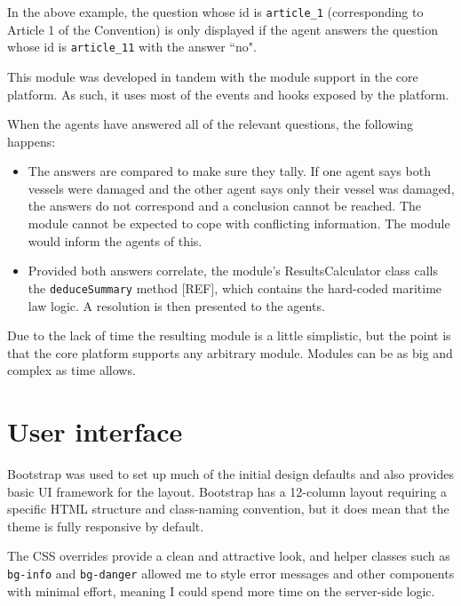 In the above example, the question whose id is \lstinline{article_1} (corresponding to Article 1 of the Convention) is only displayed if the agent answers the question whose id is \lstinline{article_11} with the answer ``no".

This module was developed in tandem with the module support in the core platform. As such, it uses most of the events and hooks exposed by the platform.

When the agents have answered all of the relevant questions, the following happens:

\begin{itemize}
    \item The answers are compared to make sure they tally. If one agent says both vessels were damaged and the other agent says only their vessel was damaged, the answers do not correspond and a conclusion cannot be reached. The module cannot be expected to cope with conflicting information. The module would inform the agents of this.
    \item Provided both answers correlate, the module's ResultsCalculator class calls the \lstinline{deduceSummary} method [REF], which contains the hard-coded maritime law logic. A resolution is then presented to the agents.
\end{itemize}

Due to the lack of time the resulting module is a little simplistic, but the point is that the core platform supports any arbitrary module. Modules can be as big and complex as time allows.

\section{User interface}

Bootstrap was used to set up much of the initial design defaults and also provides basic UI framework for the layout. Bootstrap has a 12-column layout requiring a specific HTML structure and class-naming convention, but it does mean that the theme is fully responsive by default.

The CSS overrides provide a clean and attractive look, and helper classes such as \lstinline{bg-info} and \lstinline{bg-danger} allowed me to style error messages and other components with minimal effort, meaning I could spend more time on the server-side logic.